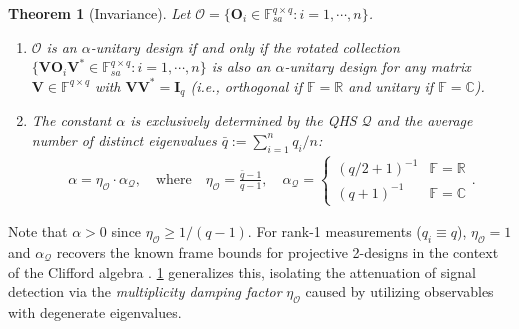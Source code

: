 \documentclass[noinfoline]{imsart}\setcounter{tocdepth}{2}
\renewcommand{\b}[1]{\mathbb{#1}} %
\newcommand{\m}[1]{\mathbf{#1}} %
\newcommand{\s}[1]{\mathscr{#1}} %
\renewcommand{\c}[1]{\mathcal{#1}} %
\theoremstyle{plain}
\newtheorem{theorem}{Theorem}[section]
\begin{document}
\begin{theorem}[Invariance]\label{thm:const:unit:dsgn}
Let $\s{O} = \{\m{O}_{i} \in \b{F}_{sa}^{q \times q}: i = 1, \cdots, n\}$.
\begin{enumerate}[leftmargin = *]
\item $\s{O}$ is an $\alpha$-unitary design if and only if the rotated collection $\{\m{V} \m{O}_{i} \m{V}^{*} \in \b{F}_{sa}^{q \times q}: i = 1, \cdots, n\}$ is also an $\alpha$-unitary design for any matrix $\m{V} \in \b{F}^{q \times q}$ with $\m{V} \m{V}^{*} = \m{I}_{q}$ (i.e., orthogonal if $\b{F} = \b{R}$ and unitary if $\b{F} = \b{C}$).
\item The constant $\alpha$ is exclusively determined by the QHS $\c{Q}$ and the average number of distinct eigenvalues $\bar{q} := \sum_{i=1}^{n} q_i / n$:
\begin{align*}
    \alpha = \eta_{\s{O}} \cdot \alpha_{\c{Q}}, \quad \text{where} \quad \eta_{\s{O}} = \frac{\bar{q} - 1}{q-1}, \quad \alpha_{\c{Q}} = \begin{cases} (q/2+1)^{-1} & \b{F}=\b{R} \\ (q+1)^{-1} & \b{F}=\b{C} \end{cases}.
\end{align*}
\end{enumerate}
\end{theorem}
Note that $\alpha > 0$ since $\eta_{\s{O}} \ge 1/(q-1)$. For rank-1 measurements ($q_{i} \equiv q$), $\eta_{\s{O}} = 1$ and $\alpha_{\c{Q}}$ recovers the known frame bounds for projective 2-designs in the context of the Clifford algebra \cite{scott2006tight, hoggar1982t}. \cref{thm:const:unit:dsgn} generalizes this, isolating the attenuation of signal detection via the \emph{multiplicity damping factor} $\eta_{\s{O}}$ caused by utilizing observables with degenerate eigenvalues.
\end{document}
